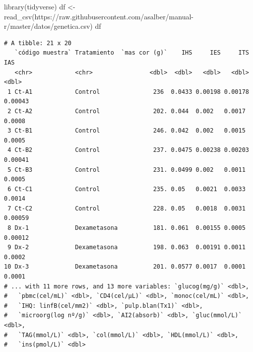 \documentclass[
  a4paper,
]{scrreport}
\newenvironment{Shaded}{\begin{snugshade}}{\end{snugshade}}
\newcommand{\FunctionTok}[1]{\textcolor[rgb]{0.28,0.35,0.67}{#1}}
\newcommand{\NormalTok}[1]{\textcolor[rgb]{0.00,0.23,0.31}{#1}}
\newcommand{\OtherTok}[1]{\textcolor[rgb]{0.00,0.23,0.31}{#1}}
\newcommand{\StringTok}[1]{\textcolor[rgb]{0.13,0.47,0.30}{#1}}
\theoremstyle{definition}
\theoremstyle{definition}
\theoremstyle{remark}
\begin{document}
\begin{tcolorbox}[enhanced jigsaw, left=2mm, colframe=quarto-callout-note-color-frame, breakable, colback=white, title=\textcolor{quarto-callout-note-color}{\faInfo}\hspace{0.5em}{Solución}, toprule=.15mm, arc=.35mm, leftrule=.75mm, colbacktitle=quarto-callout-note-color!10!white, opacityback=0, coltitle=black, opacitybacktitle=0.6, rightrule=.15mm, bottomrule=.15mm, bottomtitle=1mm, toptitle=1mm, titlerule=0mm]

\begin{Shaded}
\begin{Highlighting}[]
\FunctionTok{library}\NormalTok{(tidyverse)}
\NormalTok{df }\OtherTok{\textless{}{-}} \FunctionTok{read\_csv}\NormalTok{(}\StringTok{\textquotesingle{}https://raw.githubusercontent.com/asalber/manual{-}r/master/datos/genetica.csv\textquotesingle{}}\NormalTok{)}
\NormalTok{df}
\end{Highlighting}
\end{Shaded}

\begin{verbatim}
# A tibble: 21 x 20
   `código muestra` Tratamiento  `mas cor (g)`    IHS     IES     ITS     IAS
   <chr>            <chr>                <dbl>  <dbl>   <dbl>   <dbl>   <dbl>
 1 Ct-A1            Control               236  0.0433 0.00198 0.00178 0.00043
 2 Ct-A2            Control               202. 0.044  0.002   0.0017  0.0008 
 3 Ct-B1            Control               246. 0.042  0.002   0.0015  0.0005 
 4 Ct-B2            Control               237. 0.0475 0.00238 0.00203 0.00041
 5 Ct-B3            Control               231. 0.0499 0.002   0.0011  0.0005 
 6 Ct-C1            Control               235. 0.05   0.0021  0.0033  0.0014 
 7 Ct-C2            Control               228. 0.05   0.0018  0.0031  0.00059
 8 Dx-1             Dexametasona          181. 0.061  0.00155 0.0005  0.00012
 9 Dx-2             Dexametasona          198. 0.063  0.00191 0.0011  0.0002 
10 Dx-3             Dexametasona          201. 0.0577 0.0017  0.0001  0.0001 
# ... with 11 more rows, and 13 more variables: `glucog(mg/g)` <dbl>,
#   `pbmc(cel/mL)` <dbl>, `CD4(cel/µL)` <dbl>, `monoc(cel/mL)` <dbl>,
#   `IHQ: linfB(cel/mm2)` <dbl>, `pulp.blan(Tx1)` <dbl>,
#   `microorg(log nº/g)` <dbl>, `AI2(absorb)` <dbl>, `gluc(mmol/L)` <dbl>,
#   `TAG(mmol/L)` <dbl>, `col(mmol/L)` <dbl>, `HDL(mmol/L)` <dbl>,
#   `ins(pmol/L)` <dbl>
\end{verbatim}

\end{tcolorbox}
\end{document}
